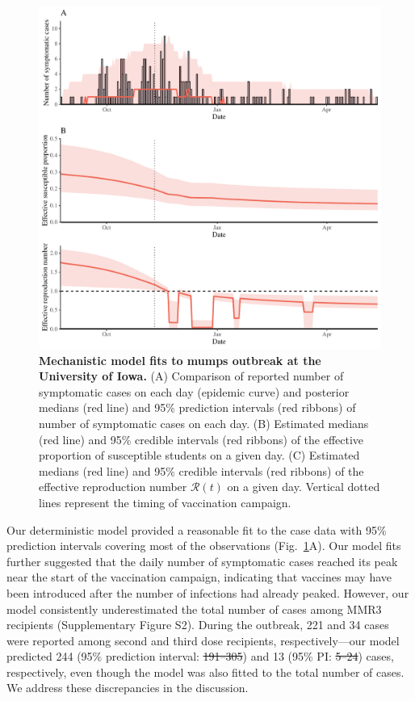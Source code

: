 \documentclass[12pt]{article}
\newcommand{\fref}[1]{Fig.~\ref{fig:#1}}
\providecommand{\DIFaddtex}[1]{{\protect\color{blue}\uwave{#1}}} %
\providecommand{\DIFdeltex}[1]{{\protect\color{red}\sout{#1}}}                      %
\providecommand{\DIFaddbegin}{} %
\providecommand{\DIFaddend}{} %
\providecommand{\DIFdelbegin}{} %
\providecommand{\DIFdelend}{} %
\providecommand{\DIFadd}[1]{\texorpdfstring{\DIFaddtex{#1}}{#1}} %
\providecommand{\DIFdel}[1]{\texorpdfstring{\DIFdeltex{#1}}{}} %
\newcommand{\DIFscaledelfig}{0.5}
\newlength{\DIFdelgraphicswidth} %
\newlength{\DIFdelgraphicsheight} %
\newcommand{\DIFaddincludegraphics}[2][]{{\color{blue}\fbox{\DIFOincludegraphics[#1]{#2}}}} %
\newcommand{\DIFdelincludegraphics}[2][]{%
\sbox{\DIFdelgraphicsbox}{\DIFOincludegraphics[#1]{#2}}%
\settoboxwidth{\DIFdelgraphicswidth}{\DIFdelgraphicsbox} %
\settoboxtotalheight{\DIFdelgraphicsheight}{\DIFdelgraphicsbox} %
\scalebox{\DIFscaledelfig}{%
\parbox[b]{\DIFdelgraphicswidth}{\usebox{\DIFdelgraphicsbox}\\[-\baselineskip] \rule{\DIFdelgraphicswidth}{0em}}\llap{\resizebox{\DIFdelgraphicswidth}{\DIFdelgraphicsheight}{%
\setlength{\unitlength}{\DIFdelgraphicswidth}%
\begin{picture}(1,1)%
\thicklines\linethickness{2pt} %
{\color[rgb]{1,0,0}\put(0,0){\framebox(1,1){}}}%
{\color[rgb]{1,0,0}\put(0,0){\line( 1,1){1}}}%
{\color[rgb]{1,0,0}\put(0,1){\line(1,-1){1}}}%
\end{picture}%
}\hspace*{3pt}}} %
} %
\DeclareRobustCommand{\DIFaddbegin}{\DIFOaddbegin \let\includegraphics\DIFaddincludegraphics} %
\DeclareRobustCommand{\DIFaddend}{\DIFOaddend \let\includegraphics\DIFOincludegraphics} %
\DeclareRobustCommand{\DIFdelbegin}{\DIFOdelbegin \let\includegraphics\DIFdelincludegraphics} %
\DeclareRobustCommand{\DIFdelend}{\DIFOaddend \let\includegraphics\DIFOincludegraphics} %
\begin{document}
\begin{figure}[!th]
\includegraphics[width=1\textwidth]{../figure_stanfit_seirv_final/figure_stanfit_trajectory.pdf}
\caption{
\textbf{Mechanistic model fits to mumps outbreak at the University of Iowa.}
(A) Comparison of reported number of symptomatic cases on each day (epidemic curve) and posterior medians (red line) and 95\% prediction intervals (red ribbons) of number of symptomatic cases on each day.
(B) Estimated medians (red line) and 95\% credible intervals (red ribbons) of the effective proportion of susceptible students on a given day.
(C) Estimated medians (red line) and 95\% credible intervals (red ribbons) of the effective reproduction number $\mathcal R(t)$ on a given day.
Vertical dotted lines represent the timing of vaccination campaign.
}
\label{fig:fit}
\end{figure}

Our deterministic model provided a reasonable fit to the case data with 95\% prediction intervals covering most of the observations (\fref{fit}A).
Our model fits further suggested that the daily number of symptomatic cases reached its peak near the start of the vaccination campaign, indicating that vaccines may have been introduced after the number of infections had already peaked.
However, our model consistently underestimated the total number of cases among MMR3 recipients (Supplementary Figure S2).
During the outbreak, 221 and 34 cases were reported among second and third dose recipients, respectively---our model predicted 244 (95\% prediction interval: \DIFdelbegin \DIFdel{191--305}\DIFdelend \DIFaddbegin \DIFadd{192--306}\DIFaddend ) and 13 (95\% PI: \DIFdelbegin \DIFdel{5--24}\DIFdelend \DIFaddbegin \DIFadd{4--24}\DIFaddend ) cases, respectively, even though the model was also fitted to the total number of cases.
We address these discrepancies in the discussion.
\end{document}
